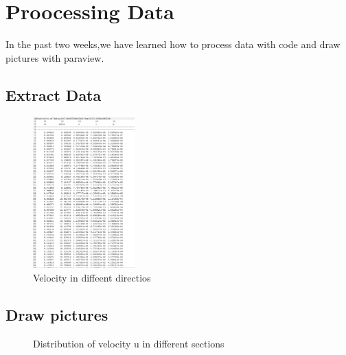 \section{Proocessing Data}
In the past two weeks,we have learned how to process data with code and draw pictures with paraview.
\subsection{Extract Data}
\begin{figure}[htbp]
\centering
    \includegraphics[width=0.35\textwidth]{src/Screenshot from 2020-12-19 14-49-07.png}
\caption{Velocity in diffeent directios}
\label{pd}
\end{figure}

\subsection{Draw pictures}
\begin{figure}[htbp]
\centering
\caption{Distribution of velocity u in different sections}
\label{pd}
\end{figure}
